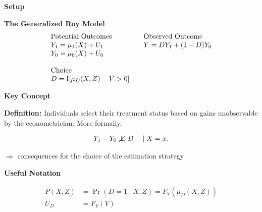 \begin{frame}\begin{center}
\LARGE\textbf{Setup}
\end{center}\end{frame}
\begin{frame}\textbf{The Generalized Roy Model}
\begin{align*}\begin{array}{l@{\qquad}l}
\text{Potential Outcomes} &\text{Observed Outcome}\\
Y_1 = \mu_1(X) + U_1      &  Y = D Y_1 + (1 - D)Y_0 \\
Y_0 = \mu_0(X) + U_0      &\\
    & \\
\text{Choice} & \\
D = \mathrm{I}[\mu_D(X, Z) - V > 0] & \\
\end{array}
\end{align*}
\end{frame}
\begin{frame}
\textbf{Key Concept}\vspace{0.5cm}

\textbf{Definition:} Individuals select their treatment status based on
gains unobservable by the econometrician. More formally,

\begin{align*}
Y_1 - Y_0 \notindep D\quad \mid X = x.
\end{align*}

\(\Rightarrow\) consequences for the choice of the estimation strategy

\end{frame}
\begin{frame}
\textbf{Useful Notation}

\begin{align*}
P(X, Z) & = \Pr(D = 1 \mid X, Z)  = F_V(\mu_D(X, Z)) \\
U_D & = F_V(V)
\end{align*}

\end{frame}
